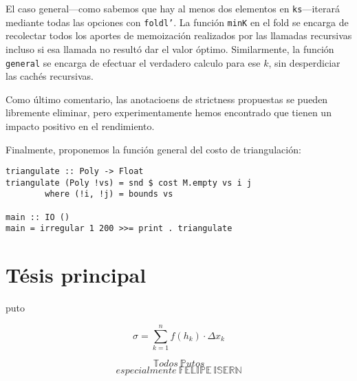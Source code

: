 \documentclass[tiny]{corsage}
\theoremstyle{plain}
\theoremstyle{definition}
\begin{document}
	El caso general---como sabemos que hay al menos dos elementos en \texttt{ks}---iterará mediante todas las opciones con \texttt{foldl'}.  La función \texttt{minK} en el fold se encarga de recolectar todos los aportes de memoización realizados por las llamadas recursivas incluso si esa llamada no resultó dar el valor óptimo.  Similarmente, la función \texttt{general} se encarga de efectuar el verdadero calculo para ese $k$, sin desperdiciar las cachés recursivas.

	Como último comentario, las anotacioens de strictness propuestas se pueden libremente eliminar, pero experimentamente hemos encontrado que tienen un impacto positivo en el rendimiento.

	Finalmente, proponemos la función general del costo de triangulación:

	\begin{verbatim}
triangulate :: Poly -> Float
triangulate (Poly !vs) = snd $ cost M.empty vs i j
        where (!i, !j) = bounds vs

main :: IO ()
main = irregular 1 200 >>= print . triangulate
	\end{verbatim}

\section{Tésis principal}
	puto

	\[ \sigma = \sum_{k = 1}^n{f(h_k) \cdot \Delta x_k} \]

	\[ \mathbb{T}odos\ \mathbb{P}utos \] 
	\[especialmente\ \mathbb{FELIPE\ ISERN} \]
\end{document}

